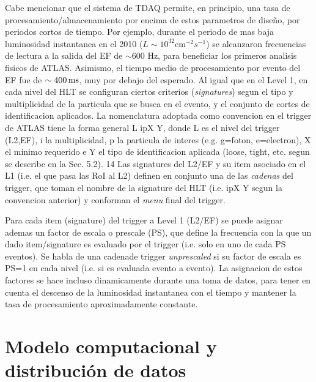 Cabe mencionar que el sistema de TDAQ permite, en principio, una tasa de procesamiento/almacenamiento
por encima de estos parametros de dise\~no, por periodos cortos de tiempo. Por ejemplo, durante el
periodo de mas baja luminosidad instantanea en el 2010 ($L\sim 10^{32} \text{cm}^{-2} s^{-1}$) se alcanzaron
frecuencias de lectura a la salida del EF de $\sim 600$ Hz, para beneficiar los primeros analisis
fisicos de ATLAS. Asimismo, el tiempo medio de procesamiento por evento del EF fue de $\sim \unit[400]{ms}$,
muy por debajo del esperado.
Al igual que en el Level 1, en cada nivel del HLT se configuran ciertos criterios
(\emph{signatures}) segun el tipo y multiplicidad de la particula que se busca en el evento,
y el conjunto de cortes de identificacion aplicados. La nomenclatura adoptada como convencion
en el trigger de ATLAS tiene la forma general L ipX Y, donde L es el nivel del
trigger (L2,EF), i la multiplicidad, p la particula de interes (e.g. g=foton, e=electron),
X el {\pt} minimo requerido e Y el tipo de identificacion aplicada (loose, tight, etc. segun
se describe en la Sec. 5.2). 14 Las signatures del L2/EF y su  item asociado en el L1 (i.e. el
que pasa las RoI al L2) definen en conjunto una de las \emph{cadenas} del trigger, que toman
el nombre de la signature del HLT (i.e. ipX Y segun la convencion anterior) y conforman
el \emph{menu} final del trigger.


Para cada item (signature) del trigger a Level 1 (L2/EF) se puede asignar ademas un
factor de escala o prescale (PS), que define la frecuencia con la que un dado item/signature
es evaluado por el trigger (i.e. solo en uno de cada PS eventos). Se habla de una
cadenade trigger \emph{unprescaled} si su factor de escala es PS=1 en cada nivel (i.e. si es evaluada
evento a evento). La asignacion de estos factores se hace incluso dinamicamente durante
una toma de datos, para tener en cuenta el descenso de la luminosidad instantanea con el
tiempo y mantener la tasa de procesamiento aproximadamente constante.


\section{Modelo computacional y distribución de datos}

